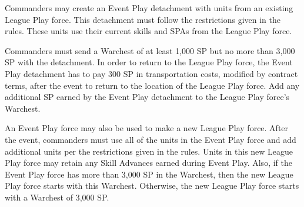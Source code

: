 Commanders may create an Event Play detachment with units from an existing League Play force.
This detachment must follow the restrictions given in the  rules.
These units use their current skills and SPAs from the League Play force.

Commanders must send a Warchest of at least 1,000 SP but no more than 3,000 SP with the detachment.
In order to return to the League Play force, the Event Play detachment has to pay 300 SP in transportation costs, modified by contract terms, after the event to return to the location of the League Play force.
Add any additional SP earned by the Event Play detachment to the League Play force's Warchest.

An Event Play force may also be used to make a new League Play force.
After the event, commanders must use all of the units in the Event Play force and add additional units per the restrictions given in the  rules.
Units in this new League Play force may retain any Skill Advances earned during Event Play.
Also, if the Event Play force has more than 3,000 SP in the Warchest, then the new League Play force starts with this Warchest.
Otherwise, the new League Play force starts with a Warchest of 3,000 SP.
